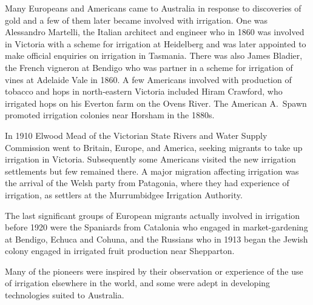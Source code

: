 Many Europeans and Americans came to
Australia in response to discoveries of gold and a few of them later
became involved with irrigation.  One was Alessandro Martelli,
 the Italian architect and engineer
who in 1860 was involved in Victoria with a scheme for irrigation at
Heidelberg and was later appointed to make official enquiries on
irrigation in Tasmania.  There was also James Bladier,  the French vigneron at Bendigo who was partner in a
scheme for irrigation of vines at Adelaide Vale in
1860.  A few Americans involved with production of
tobacco and hops in north-eastern Victoria
included Hiram Crawford,   who irrigated hops on
his Everton farm on the Ovens River.   The
American A.~Spawn  promoted
irrigation colonies near Horsham  in the 1880s.

In 1910 Elwood Mead of the Victorian State Rivers and
Water Supply Commission went to Britain,
Europe, and America, seeking migrants to
take up irrigation in Victoria.  Subsequently some
Americans visited the new irrigation settlements but
few remained there.  A major migration affecting irrigation was the
arrival of the Welsh party from Patagonia, where they had
experience of irrigation, as settlers at the Murrumbidgee Irrigation
Authority.

The last significant groups of European migrants
actually involved in irrigation before 1920 were the Spaniards
 from Catalonia who engaged in
market-gardening at Bendigo, Echuca and Cohuna, and
the Russians  who in 1913 began the Jewish colony
engaged in irrigated fruit production near Shepparton.

\bigskip\noindent
Many of the pioneers were inspired by their observation or experience
of the use of irrigation elsewhere in the world, and some were adept
in developing technologies suited to Australia.

